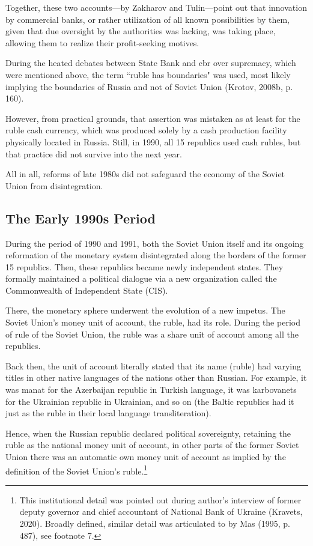 Together, these two accounts---by Zakharov and Tulin---point out that innovation by commercial banks, or rather utilization of all known possibilities by them, given that due oversight by the authorities was lacking, was taking place, allowing them to realize their profit-seeking motives.

During the heated debates between State Bank and \ac{cbr} over supremacy, which were mentioned above, the term ``ruble has boundaries" was used, most likely implying the boundaries of Russia and not of Soviet Union (Krotov, 2008b, p. 160). 

However, from practical grounds, that assertion was mistaken as at least for the ruble cash currency, which was produced solely by a cash production facility physically located in Russia. Still, in 1990, all 15 republics used cash rubles, but that practice did not survive into the next year.

All in all, reforms of late 1980s did not safeguard the economy of the Soviet Union from disintegration.

\subsection{The Early 1990s Period}

During the period of 1990 and 1991, both the Soviet Union itself and its ongoing reformation of the monetary system disintegrated along the borders of the former 15 republics. Then, these republics became newly independent states. They formally maintained a political dialogue via a new organization called the Commonwealth of Independent State (CIS). 

There, the monetary sphere underwent the evolution of a new impetus. The Soviet Union's money unit of account, the ruble, had its role. During the period of rule of the Soviet Union, the ruble was a share unit of account among all the republics. 

Back then, the unit of account literally stated that its name (ruble) had varying titles in other native languages of the nations other than Russian. For example, it was manat for the Azerbaijan republic in Turkish language, it was karbovanets for the Ukrainian republic in Ukrainian, and so on (the Baltic republics had it just as the ruble in their local language transliteration). 

Hence, when the Russian republic declared political sovereignty, retaining the ruble as the national money unit of account, in other parts of the former Soviet Union  there was an automatic own money unit of account as implied by the definition of the Soviet Union's ruble.\footnote{This institutional detail was pointed out during author's interview of former deputy governor and chief accountant of National Bank of Ukraine (Kravets, 2020). Broadly defined, similar detail was articulated to by Mas (1995, p. 487), see footnote 7.}

